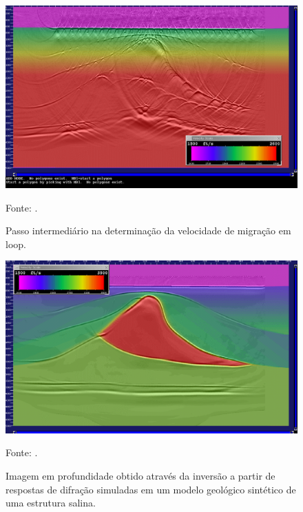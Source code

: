 \begin{figure}[htb]
\caption{Passo intermediário na determinação da velocidade de migração em loop.}
\begin{center}
\includegraphics[scale=0.30]{images/simula_diff_campo.png}
\vspace{-0.3cm}
\end{center}
\begin{center}
 Fonte: \cite{diffractions}.
\end{center}
\label{fig:8.2}
\end{figure}

\begin{figure}[htb]
\caption{Imagem em profundidade obtido através da inversão a partir de respostas de difração simuladas 
em um modelo geológico sintético de uma estrutura salina.}
\begin{center}
\includegraphics[scale=0.30]{images/simula_diff_vel.png}
\vspace{-0.3cm}
\end{center}
\begin{center}
 Fonte: \cite{diffractions}.
\end{center}
\label{fig:8.3}
\end{figure}

